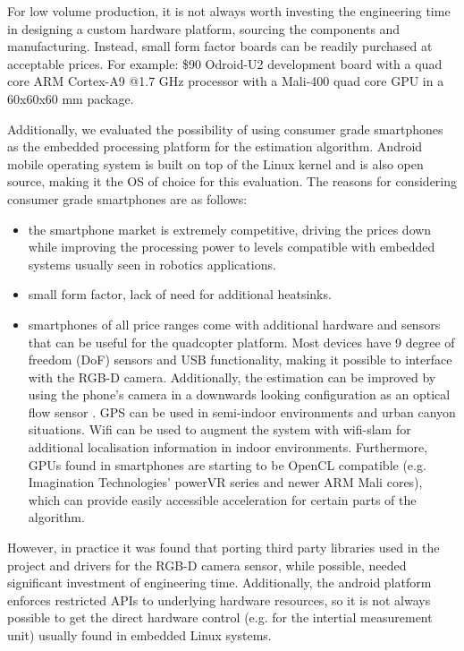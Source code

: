 \documentclass[]{article}
\begin{document}
{For low volume production, it is not always worth investing the engineering time in designing a custom hardware platform, sourcing the components and manufacturing. Instead, small form factor boards can be readily purchased at acceptable prices. For example: \$90 Odroid-U2 development board with a quad core ARM Cortex-A9 @1.7 GHz processor with a Mali-400 quad core GPU in a 60x60x60 mm package.

Additionally, we evaluated the possibility of using consumer grade smartphones as the embedded processing platform for the estimation algorithm. Android mobile operating system is built on top of the Linux kernel and is also open source, making it the OS of choice for this evaluation. The reasons for considering consumer grade smartphones are as follows:

\begin{itemize}
	\item the smartphone market is extremely competitive, driving the prices down while improving the processing power to levels compatible with embedded systems usually seen in robotics applications.
	\item small form factor, lack of need for additional heatsinks.
	\item smartphones of all price ranges come with additional hardware and sensors that can be useful for the quadcopter platform. Most devices have 9 degree of freedom (DoF) sensors and USB functionality, making it possible to interface with the RGB-D camera. Additionally, the estimation can be improved by using the phone's camera in a downwards looking configuration as an optical flow sensor \cite{DBLP:conf/icra/GrabeBG12}. GPS can be used in semi-indoor environments and urban canyon situations. Wifi can be used to augment the system with wifi-slam \cite{Wifi-slam} for additional localisation information in indoor environments. Furthermore, GPUs found in smartphones are starting to be OpenCL compatible (e.g. Imagination Technologies' powerVR series and newer ARM Mali cores), which can provide easily accessible acceleration for certain parts of the algorithm.
\end{itemize}

However, in practice it was found that porting third party libraries used in the project and drivers for the RGB-D camera sensor, while possible, needed significant investment of engineering time. Additionally, the android platform enforces restricted APIs to underlying hardware resources, so it is not always possible to get the direct hardware control (e.g. for the intertial measurement unit) usually found in embedded Linux systems.

}
\end{document}
